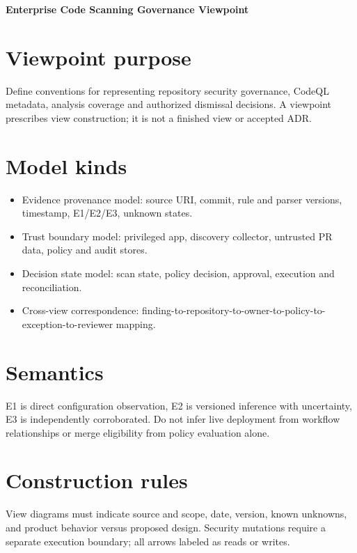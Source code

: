 \documentclass[11pt,letterpaper]{article}
\begin{document}
\begin{center}
{\LARGE\bfseries Enterprise Code Scanning Governance Viewpoint}\par
\vspace{5pt}{\large Reusable conventions for security architecture views}\par
\vspace{9pt}{\small Engineering reference | Proposed design | Not a deployment or approval record}\par
\end{center}
\tableofcontents
\clearpage
\section{Viewpoint purpose}
Define conventions for representing repository security governance, CodeQL metadata, analysis coverage and authorized dismissal decisions. A viewpoint prescribes view construction; it is not a finished view or accepted ADR.


\section{Model kinds}
\begin{itemize}
\item Evidence provenance model: source URI, commit, rule and parser versions, timestamp, E1/E2/E3, unknown states.
\item Trust boundary model: privileged app, discovery collector, untrusted PR data, policy and audit stores.
\item Decision state model: scan state, policy decision, approval, execution and reconciliation.
\item Cross-view correspondence: finding-to-repository-to-owner-to-policy-to-exception-to-reviewer mapping.
\end{itemize}

\section{Semantics}
E1 is direct configuration observation, E2 is versioned inference with uncertainty, E3 is independently corroborated. Do not infer live deployment from workflow relationships or merge eligibility from policy evaluation alone.


\section{Construction rules}
View diagrams must indicate source and scope, date, version, known unknowns, and product behavior versus proposed design. Security mutations require a separate execution boundary; all arrows labeled as reads or writes.
\end{document}
